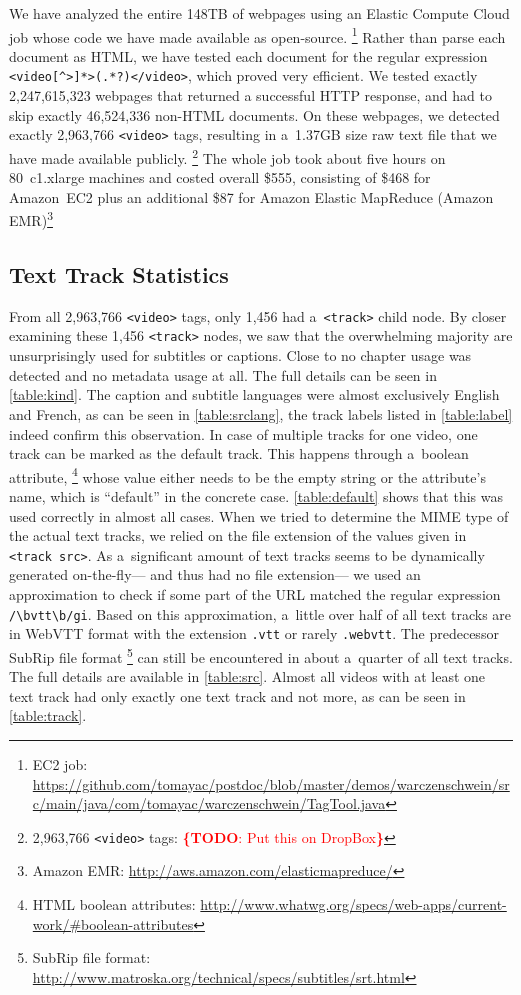 \documentclass{sig-alternate}
\newcommand{\inlinelistingsize}{\fontsize{8pt}{11pt}}
\let\oldurl\url
\renewcommand{\url}[1]{\inlinelistingsize\oldurl{#1}}
\newcommand{\todo}[1]{\noindent\textcolor{red}{{\bf \{TODO}: #1{\bf \}}}}
\begin{document}
We have analyzed the entire 148TB of webpages
using an Elastic Compute Cloud job
whose code we have made available as open-source.%
\footnote{EC2 job:
\url{https://github.com/tomayac/postdoc/blob/master/demos/warczenschwein/src/main/java/com/tomayac/warczenschwein/TagTool.java}}
Rather than parse each document as HTML,
we have tested each document for the regular expression
\texttt{<video[\^{}>]*>(.*?)</video>},
which proved very efficient.
We tested exactly 2,247,615,323 webpages
that returned a successful HTTP response,
and had to skip exactly 46,524,336  non-HTML documents.
On these webpages, we detected exactly
2,963,766 \texttt{<video>} tags,
resulting in a~1.37GB size raw text file
that we have made available publicly.%
\footnote{2,963,766 \texttt{<video>} tags: \todo{Put this on DropBox}}
The whole job took about five hours on
80~c1.xlarge machines and costed overall \$555,
consisting of \$468 for Amazon~EC2
plus an additional \$87 for Amazon Elastic MapReduce
 (Amazon EMR)\footnote{Amazon EMR:
\url{http://aws.amazon.com/elasticmapreduce/}}

\subsection{Text Track Statistics}

From all 2,963,766 \texttt{<video>} tags,
only 1,456 had a~\texttt{<track>} child node.
By closer examining these 1,456 \texttt{<track>} nodes,
we saw that the overwhelming majority are unsurprisingly
used for subtitles or captions.
Close to no chapter usage was detected
and no metadata usage at all.
The full details can be seen in \autoref{table:kind}.
The caption and subtitle languages were
almost exclusively English and French,
as can be seen in \autoref{table:srclang},
the track labels listed in \autoref{table:label}
indeed confirm this observation.
In case of multiple tracks for one video,
one track can be marked as the default track.
This happens through a~boolean attribute,%
\footnote{HTML boolean attributes:
\url{http://www.whatwg.org/specs/web-apps/current-work/\#boolean-attributes}}
whose value either needs to be the empty string
or the attribute's name,
which is ``default'' in the concrete case.
\autoref{table:default}
shows that this was used correctly in almost all cases.
When we tried to determine the MIME type of the actual
text tracks, we relied on the file extension
of the values given in \texttt{<track src>}.
As a~significant amount of text tracks
seems to be dynamically generated on-the-fly---%
and thus had no file extension---%
we used an approximation to check if some part
of the URL matched the regular expression \texttt{/\textbackslash bvtt\textbackslash b/gi}.
Based on this approximation,
a~little over half of all text tracks
are in WebVTT format
with the extension \texttt{.vtt}
or rarely \texttt{.webvtt}.
The predecessor SubRip file format%
\footnote{SubRip file format:
\url{http://www.matroska.org/technical/specs/subtitles/srt.html}}
can still be encountered in about
a~quarter of all text tracks.
The full details are available in \autoref{table:src}.
Almost all videos with at least one text track
had only exactly one text track and not more,
as can be seen in \autoref{table:track}.
\end{document}
